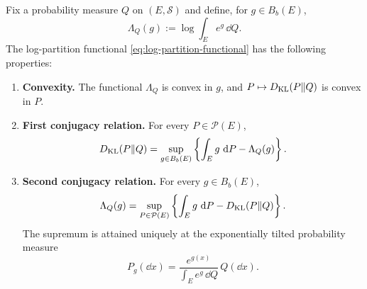 \documentclass[12pt,a4paper,oneside]{book}
\begin{document}
\begin{corollary}
\label{cor:dv-duality-both-directions}

Fix a probability measure $Q$ on $(E,\mathcal S)$ and define, for $g\in B_b(E)$,
\begin{equation}
    \Lambda_Q(g) := \log\int_E e^g\,\dd Q.
    \label{eq:log-partition-functional}
\end{equation}
The log-partition functional \eqref{eq:log-partition-functional} has the following properties:

\begin{enumerate}

    \item \textbf{Convexity.} The functional $\Lambda_Q$ is convex in $g$, and $P\mapsto D_{\mathrm{KL}}(P\Vert Q)$ is convex in $P$.

    \item \textbf{First conjugacy relation.} For every $P\in\mathcal P(E)$,
        \begin{equation}
                D_{\mathrm{KL}}(P\Vert Q) = \sup_{g\in B_b(E)}
                \left\{
                    \int_E g\,\,\mathrm{d} P-\Lambda_Q(g)
                \right\}.
            \label{eq:dv-first-conjugacy}
        \end{equation}

    \item \textbf{Second conjugacy relation.} For every $g\in B_b(E)$,
        \begin{equation}
            \Lambda_Q(g) = \sup_{P\in\mathcal P(E)}
                \left\{
                    \int_E g\,\,\mathrm{d} P-D_{\mathrm{KL}}(P\Vert Q)
                \right\}.
            \label{eq:dv-second-conjugacy}
        \end{equation}
        The supremum is attained uniquely at the exponentially tilted probability measure
        \begin{equation}
            P_g(\dd x) = \frac{e^{g(x)}}{\int_E e^g\,\dd Q}\,Q(\dd x).
            \label{eq:dv-exponential-tilting}
        \end{equation}
\end{enumerate}
\end{corollary}
\end{document}

